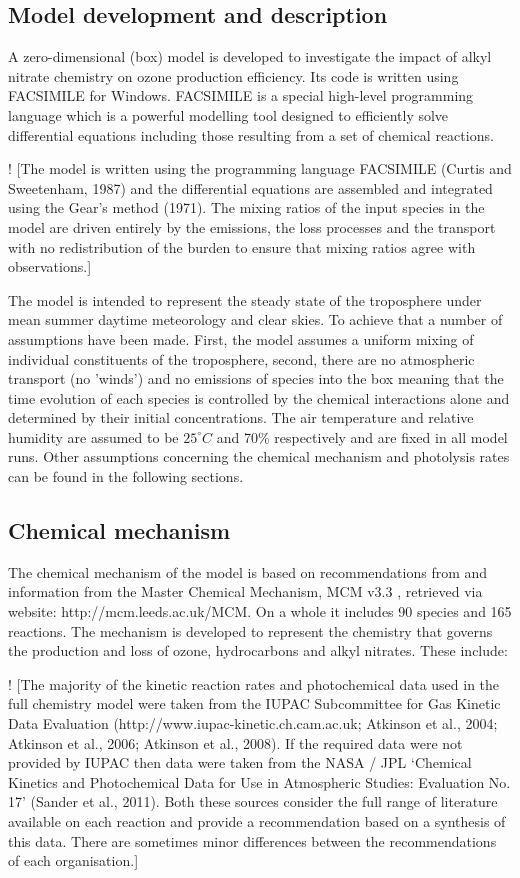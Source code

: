 \documentclass[11pt,a4paper]{article}
\begin{document}
\subsection{Model development and description}
A zero-dimensional (box) model is developed to investigate the impact of alkyl nitrate chemistry on ozone production efficiency. Its code is written using FACSIMILE for Windows. FACSIMILE is a special high-level programming language which is a powerful modelling tool designed to efficiently solve differential equations including those resulting from a set of chemical reactions.

! \citep{Newland2013}
[The model is written using the programming language FACSIMILE (Curtis and Sweetenham, 1987) and the differential equations are assembled and integrated using the Gear’s method (1971). The mixing ratios of the input species in the model are driven entirely by the emissions, the loss processes and the transport with no redistribution of the burden to ensure that mixing ratios agree with observations.]

The model is intended to represent the steady state of the troposphere under mean summer daytime meteorology and clear skies. To achieve that a number of assumptions have been made. First, the model assumes a uniform mixing of individual constituents of the troposphere, second, there are no atmospheric transport (no 'winds') and no emissions of species into the box meaning that the time evolution of each species is controlled by the chemical interactions alone and determined by their initial concentrations. The air temperature and relative humidity are assumed to be $25^{\circ}C$ and 70\% respectively and are fixed in all model runs. Other assumptions concerning the chemical mechanism and photolysis rates can be found in the following sections.

\subsection{Chemical mechanism}
The chemical mechanism of the model is based on recommendations from \citep{Atkinson2004} and information from the Master Chemical Mechanism, MCM v3.3 \citep{Jenkin1997,Saunders2003}, retrieved via website: http://mcm.leeds.ac.uk/MCM. On a whole it includes 90 species and 165 reactions. The mechanism is developed to represent the chemistry that governs the production and loss of ozone, hydrocarbons and alkyl nitrates. These include:

! \citep{Newland2013}
[The majority of the kinetic reaction rates and photochemical data used in the full chemistry model were taken from the IUPAC Subcommittee for Gas Kinetic Data Evaluation (http://www.iupac-kinetic.ch.cam.ac.uk; Atkinson et al., 2004; Atkinson et al., 2006; Atkinson et al., 2008). If the required data were not provided by IUPAC then data were taken from the NASA / JPL ‘Chemical Kinetics and Photochemical Data for Use in Atmospheric Studies: Evaluation No. 17’ (Sander et al., 2011). Both these sources consider the full range of literature available on each reaction and provide a recommendation based on a synthesis of this data. There are sometimes minor differences between the recommendations of each organisation.]
\end{document}
